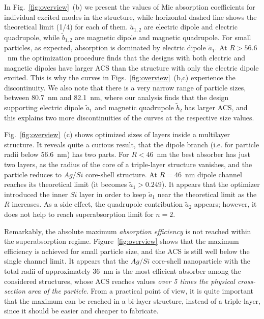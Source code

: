 \documentclass[aps,prl,twocolumn,showpacs,superscriptaddress,groupedaddress]{revtex4-1}  %
\begin{document}
In Fig.~\ref{fig:overview}~(b) we present the values of Mie absorption
coefficients for individual excited modes in the structure, while
horizontal dashed line shows the theoretical limit (1/4) for each of
them. $\tilde{a}_{1,2}$ are electric dipole and electric quadrupole,
while $\tilde{b}_{1,2}$ are magnetic dipole and magnetic
quadrupole. For small particles, as expected, absorption is dominated
by electric dipole $\tilde{a}_1$.  At $R > 56.6$~nm the optimization
procedure finds that the designs with both electric and magnetic
dipoles have larger ACS than the structure with only the electric
dipole excited. This is why the curves in
Figs.~\ref{fig:overview}~(b,c) experience the discontinuity. We also
note that there is a very narrow range of particle sizes, between
80.7~nm and 82.1~nm, where our analysis finds that the design
supporting electric dipole $\tilde{a}_1$ and magnetic quadrupole
$\tilde{b}_2$ has larger ACS, and this explains two more
discontinuities of the curves at the respective size values.

Fig.~\ref{fig:overview}~(c) shows optimized sizes of layers inside a
multilayer structure. It reveals quite a curious result, that the
dipole branch (i.e. for particle radii below 56.6~nm) has two
parts. For $R<46$~nm the best absorber has just two layers, as the
radius of the core of a triple-layer structure vanishes, and the
particle reduces to $Ag/Si$ core-shell structure.  At $R=46$~nm dipole
channel reaches its theoretical limit (it becomes
$\tilde{a}_1>0.249$).  It appears that the optimizer introduced the
inner $Si$ layer in order to keep $\tilde{a}_1$ near the theoretical
limit as the $R$ increases.  As a side effect, the quadrupole
contribution $\tilde{a}_2$ appears; however, it does not help to reach
superabsorption limit for $n=2$.

Remarkably, the absolute maximum {\em absorption efficiency} is not
reached within the superabsorption regime. Figure~\ref{fig:overview}
shows that the maximum efficiency is achieved for small particle size,
and the ACS is still well below the single channel limit. It appears
that the $Ag/Si$ core-shell nanoparticle with the total radii of
approximately 36~nm is the most efficient absorber among the considered
structures, whose ACS reaches values {\em over 5 times the physical
  cross-section area of the particle}.  From a practical point of view,
it is quite important that the maximum can be reached in a bi-layer
structure, instead of a triple-layer, since it should be easier and
cheaper to fabricate.
\end{document}
